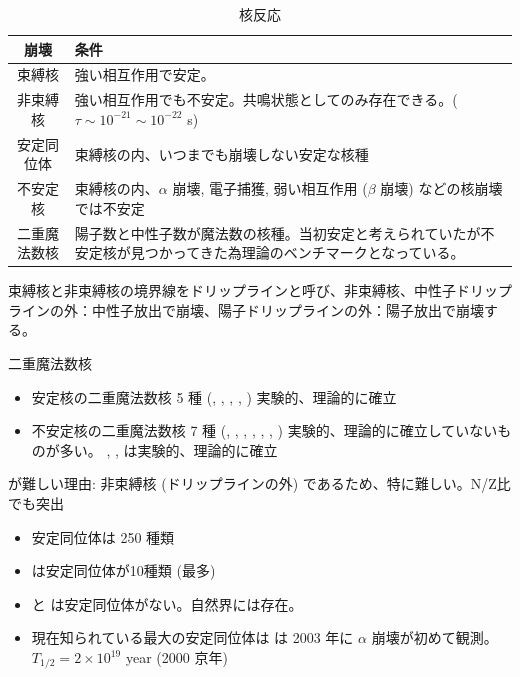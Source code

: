 \documentclass[uplatex,dvipdfmx,a4paper,11pt]{jlreq}
\numberwithin{equation}{section}
\theoremstyle{definition}
\begin{document}
\begin{table}[hbtp]
  \centering
  \begin{tabular}{|c|l|}
    \hline
    崩壊     & 条件                                                                   \\
    \hline \hline
    束縛核    & 強い相互作用で安定。                                                           \\
    非束縛核   & 強い相互作用でも不安定。共鳴状態としてのみ存在できる。($\tau\sim 10^{-21}\sim 10^{-22}$ \si{s}) \\
    安定同位体  & 束縛核の内、いつまでも崩壊しない安定な核種                                                \\
    不安定核   & 束縛核の内、$\alpha$ 崩壊, 電子捕獲, 弱い相互作用 ($\beta$ 崩壊) などの核崩壊では不安定             \\
    二重魔法数核 & 陽子数と中性子数が魔法数の核種。当初安定と考えられていたが不安定核が見つかってきた為理論のベンチマークとなっている。           \\
    \hline
  \end{tabular}
  \caption{核反応}
  \label{table:}
\end{table}
束縛核と非束縛核の境界線をドリップラインと呼び、非束縛核、中性子ドリップラインの外：中性子放出で崩壊、陽子ドリップラインの外：陽子放出で崩壊する。

⼆重魔法数核
\begin{itemize}
  \item 安定核の二重魔法数核 5 種 (, , , , )
        実験的、理論的に確⽴
  \item 不安定核の二重魔法数核 7 種 (, , , , , , )
        実験的、理論的に確立していないものが多い。 , ,  は実験的、理論的に確立
\end{itemize}
 が難しい理由: 非束縛核 (ドリップラインの外) であるため、特に難しい。N/Z比でも突出

\begin{itemize}
  \item 安定同位体は 250 種類
  \item {} は安定同位体が10種類 (最多)
  \item {} と は安定同位体がない。自然界には存在。
  \item 現在知られている最大の安定同位体は 
         は 2003 年に $\alpha$ 崩壊が初めて観測。$T_{1/2} = 2\times 10^{19}$ year (2000 京年)
\end{itemize}
\end{document}
